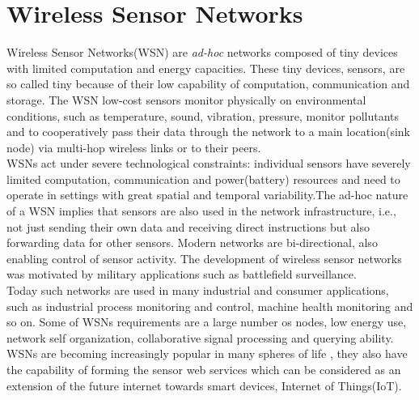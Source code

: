 \chapter{Wireless Sensor Networks}\label{chap:wsn}
Wireless Sensor Networks(WSN) are \textit{ad-hoc} networks composed of tiny devices with limited computation and energy capacities. These tiny devices, sensors, are so called tiny because of their low capability of computation, communication and storage. The WSN  low-cost sensors monitor physically on environmental conditions, such as temperature, sound, vibration, pressure, monitor pollutants and to cooperatively pass their data through the network to a main location(sink node) via multi-hop wireless links\cite{asad2013survey} or to their peers.\\ 
WSNs act under severe technological constraints: individual sensors have severely limited computation, communication and power(battery) resources and need to operate in settings with great spatial and temporal variability.The ad-hoc nature of a WSN implies that sensors are also used in the network infrastructure, i.e., not just sending their own data and receiving direct instructions but also forwarding data for other sensors. Modern networks are bi-directional, also enabling control of sensor activity. The development of wireless sensor networks was motivated by military applications such as battlefield surveillance.\\
Today such networks are used in many industrial and consumer applications, such as industrial process monitoring and control, machine health monitoring and so on. Some of WSNs requirements are a large number os nodes, low energy use, network self organization, collaborative signal processing and querying ability.\\
 WSNs are becoming increasingly popular in many spheres of life \cite{castelluccia2005efficient}, they also have the capability of forming the sensor web services which can be considered as an extension of the future internet towards smart devices, Internet of Things(IoT)\cite{asad2013survey}.  \\


